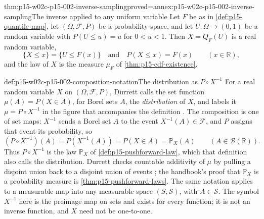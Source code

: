 \begin{hbcorollary}{thm:p15-w02c-p15-002-inverse-sampling}{proved=annex:p15-w02c-p15-002-inverse-sampling}{The inverse applied to any uniform variable}
Let \(F\) be as in \cref{def:p15-quantile-map}, let
\((\Omega,\mathcal F,P)\) be a probability space, and let
\(U:\Omega\to(0,1)\) be a random variable with \(P(U\leq u)=u\) for
\(0<u<1\). Then \(X=Q_F(U)\) is a real random variable,
\[
 \{X\leq x\}=\{U\leq F(x)\}\quad\text{and}\quad P(X\leq x)=F(x)
 \qquad(x\in\mathbb R),
\]
and the law of \(X\) is the measure \(\mu_F\) of
\cref{thm:p15-cdf-existence}.
\end{hbcorollary}

\begin{hbconvention}{def:p15-w02c-p15-002-composition-notation}{The distribution as \(P\circ X^{-1}\)}
For a real random variable \(X\) on \((\Omega,\mathcal F,P)\), Durrett
calls the set function \(\mu(A)=P(X\in A)\), for Borel sets \(A\), the
\emph{distribution} of \(X\), and labels it \(\mu=P\circ X^{-1}\) in the
figure that accompanies the definition
\cite[sec.~1.2, Figure~1.3, p.~10]{DurrettPTEAuthor2019}. The composition is
one of set maps: \(X^{-1}\) sends a Borel set \(A\) to the event
\(X^{-1}(A)\in\mathcal F\), and \(P\) assigns that event its probability,
so
\[
 (P\circ X^{-1})(A)=P(X^{-1}(A))=P(X\in A)=\mathbb P_X(A)
 \qquad(A\in\mathcal B(\mathbb R)).
\]
Thus \(P\circ X^{-1}\) is the law \(\mathbb P_X\) of
\cref{def:p15-pushforward-law}, which that definition also calls the
distribution. Durrett checks countable additivity of \(\mu\) by pulling a
disjoint union back to a disjoint union of events
\cite[p.~10]{DurrettPTEAuthor2019}; the handbook's proof that
\(\mathbb P_X\) is a probability measure is \cref{thm:p15-pushforward-laws}.
The same notation applies to a measurable map into any measurable space
\((S,\mathcal S)\), with \(A\in\mathcal S\). The symbol \(X^{-1}\) here is
the preimage map on sets and exists for every function; it is not an
inverse function, and \(X\) need not be one-to-one.
\end{hbconvention}

